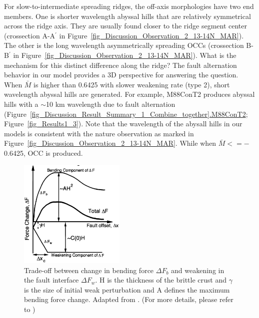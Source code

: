 For slow-to-intermediate spreading ridges, the off-axis morphologies have two end members. One is shorter wavelength abyssal hills that are relatively symmetrical across the ridge axis. They are usually found closer to the ridge segment center (crossection A-A$^{\prime}$ in Figure~\hyperref[fig_Discussion_Observation_2_13-14N_MAR]{\ref{fig_Discussion_Observation_2_13-14N_MAR}}). The other is the long wavelength asymmetrically spreading OCCs (crossection B-B$^{\prime}$ in Figure~\hyperref[fig_Discussion_Observation_2_13-14N_MAR]{\ref{fig_Discussion_Observation_2_13-14N_MAR}}). What is the mechanism for this distinct difference along the ridge? The fault alternation behavior in our model provides a 3D perspective for answering the question. When $\bar{M}$ is higher than 0.6425 with slower weakening rate (type 2), short wavelength abyssal hills are generated. For example, M88ConT2 produces abyssal hills with a $\sim$10 km wavelength due to fault alternation (Figure~\hyperref[fig_Discussion_Result_Summary_1_Combine_together]{\ref{fig_Discussion_Result_Summary_1_Combine_together}.M88ConT2}; Figure~\hyperref[fig_Results1_3]{\ref{fig_Results1_3}}). Note that the wavelength of the abysall hills in our models is consistent with the nature observation as marked in Figure~\hyperref[fig_Discussion_Observation_2_13-14N_MAR]{\ref{fig_Discussion_Observation_2_13-14N_MAR}}. While when $\bar{M} <=-$0.6425, OCC is produced.

\begin{figure}[h]
 \centering
  \includegraphics[width=0.45\textwidth]{./Figures/fig_Results_Weakening_1_tradeOff_bend_weak.png}
 \caption[Trade-off between change in bending force $\Delta F_{b}$ and weakening in the fault interface $\Delta F_{w}$. Adapted from \citep{Lavier2000}.]{Trade-off between change in bending force $\Delta F_{b}$ and weakening in the fault interface $\Delta F_{w}$. H is the thickness of the brittle crust and $\gamma$ is the size of initial weak perturbation and A defines the maximum bending force change. Adapted from \citep{Lavier2000}. (For more details, please refer to \citep{Lavier2000})}
 \label{fig_Results_Weakening_1}
\end{figure}

